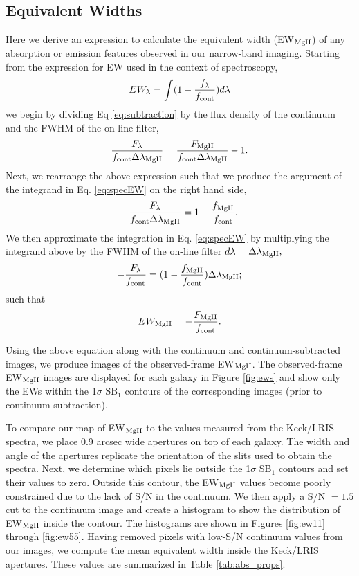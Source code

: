 \documentclass[twocolumn]{aastex61}
\begin{document}
\subsection{Equivalent Widths}\label{subsec.ew}
Here we derive an expression to calculate the equivalent width (EW$_{\rm{MgII}}$) of any absorption or emission features observed in our narrow-band imaging. Starting from the expression for EW used in the context of spectroscopy,
\begin{equation}
EW_{\lambda}=\int (1-\frac{f_{\lambda}}{f_{\rm{cont}}})d\lambda
\label{eq:specEW}
\end{equation}
we begin by dividing Eq \ref{eq:subtraction} by the flux density of the continuum and the FWHM of the on-line filter,
\begin{equation}
\frac{F_{\lambda}}{f_{\rm{cont}}\Delta \lambda_{\rm{MgII}}}=\frac{F_{\rm{MgII}}}{f_{\rm{cont}}\Delta \lambda_{\rm{MgII}}}- 1.
\end{equation}
Next, we rearrange the above expression such that we produce the argument of the integrand in Eq. \ref{eq:specEW} on the right hand side,
\begin{equation}
-\frac{F_{\lambda}}{f_{\rm{cont}}\Delta \lambda_{\rm{MgII}}}=1-\frac{f_{\rm{MgII}}}{f_{\rm{cont}}}.
\end{equation}
We then approximate the integration in Eq. \ref{eq:specEW} by multiplying the integrand above by the FWHM of the on-line filter $d\lambda=\Delta \lambda_{\rm{MgII}},$
\begin{equation}
-\frac{F_{\lambda}}{f_{\rm{cont}}}=(1-\frac{f_{\rm{MgII}}}{f_{\rm{cont}}})\Delta \lambda_{\rm{MgII}};
\end{equation}
such that
\begin{equation}
EW_{\rm{MgII}}=-\frac{F_{\rm{MgII}}}{f_{\rm{cont}}}.
\end{equation}

Using the above equation along with the continuum and continuum-subtracted images, we produce images of the observed-frame EW$_{\rm{MgII}}$. The observed-frame EW$_{\rm{MgII}}$ images are displayed for each galaxy in Figure \ref{fig:ews} and show only the EWs within the 1$\sigma$ SB$_1$ contours of the corresponding  images (prior to continuum subtraction). 

To compare our map of EW$_{\rm{MgII}}$ to the values measured from the Keck/LRIS spectra, we place 0.9 arcsec wide apertures on top of each galaxy. The width and angle of the apertures replicate the orientation of the slits used to obtain the spectra. Next, we determine which pixels lie outside the 1$\sigma$ SB$_1$ contours and set their values to zero. Outside this contour, the EW$_{\rm{MgII}}$ values become poorly constrained due to the lack of S/N in the continuum. We then apply a S/N $= 1.5$ cut to the continuum image and create a histogram to show the distribution of EW$_{\rm{MgII}}$ inside the contour. The histograms are shown in Figures \ref{fig:ew11} through \ref{fig:ew55}. Having removed pixels with low-S/N continuum values from our images, we compute the mean equivalent width inside the Keck/LRIS apertures. These values are summarized in Table \ref{tab:abs_props}.
 
\end{document}
